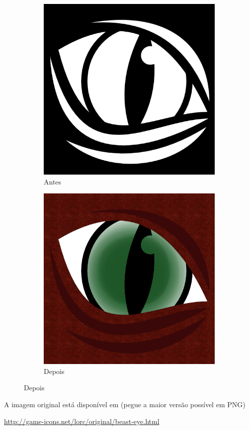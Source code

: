 \documentclass[12pt,onecolumn]{article}
\begin{document}
    \begin{figure}[H]
    \centering
    \begin{subfigure}{.5\textwidth}
      \centering
      \includegraphics[width=.7\linewidth]{beast-eye.png}
      \caption{Antes}
      \label{fig:sub1}
    \end{subfigure}%
    \begin{subfigure}{.5\textwidth}
      \centering
      \includegraphics[width=.7\linewidth]{draft00.png}
      \caption{Depois}
      \label{fig:sub2}
    \end{subfigure}
    \label{fig:test}
    \end{figure}

    A imagem original está disponível em (pegue a maior versão possível em PNG)
    \begin{center}
      \url{http://game-icons.net/lorc/original/beast-eye.html}      
    \end{center}
\end{document}
